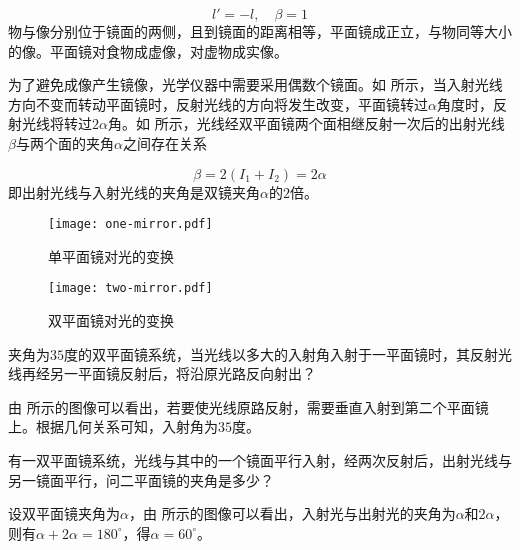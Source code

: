\documentclass[cn,10pt,chinesefont=founder,math=newtx,cite=super,twoside]{elegantbook}
\begin{document}
\begin{equation}
l'=-l,\quad\beta=1
\end{equation}
物与像分别位于镜面的两侧，且到镜面的距离相等，平面镜成正立，与物同等大小的像。平面镜对食物成虚像，对虚物成实像。

为了避免成像产生镜像，光学仪器中需要采用偶数个镜面。如 所示，当入射光线方向不变而转动平面镜时，反射光线的方向将发生改变，平面镜转过$\alpha$角度时，反射光线将转过$2\alpha$角。如 所示，光线经双平面镜两个面相继反射一次后的出射光线$\beta$与两个面的夹角$\alpha$之间存在关系

\begin{equation}
\beta=2(I_1+I_2)=2\alpha
\end{equation}
即出射光线与入射光线的夹角是双镜夹角$\alpha$的$2$倍。

\begin{figure}[htbp]
	\centering
	\begin{minipage}[t]{0.45\textwidth}
		\centering
		\texttt{[image: one-mirror.pdf]}
		\caption{单平面镜对光的变换}
		\label{fig:one-mirror}
	\end{minipage}
	\qquad
	\begin{minipage}[t]{0.45\textwidth}
		\centering
		\texttt{[image: two-mirror.pdf]}
		\caption{双平面镜对光的变换}
		\label{fig:two-mirror}
	\end{minipage}
\end{figure}

\begin{problem}
	夹角为$35$度的双平面镜系统，当光线以多大的入射角入射于一平面镜时，其反射光线再经另一平面镜反射后，将沿原光路反向射出？
\end{problem}
\begin{solution}
	由 所示的图像可以看出，若要使光线原路反射，需要垂直入射到第二个平面镜上。根据几何关系可知，入射角为$35$度。
\end{solution}

\begin{problem}
	有一双平面镜系统，光线与其中的一个镜面平行入射，经两次反射后，出射光线与另一镜面平行，问二平面镜的夹角是多少？
\end{problem}
\begin{solution}
	设双平面镜夹角为$\alpha$，由 所示的图像可以看出，入射光与出射光的夹角为$\alpha$和$2\alpha$，则有$\alpha+2\alpha=180^{\circ}$，得$\alpha=60^{\circ}$。
\end{solution}
\end{document}
